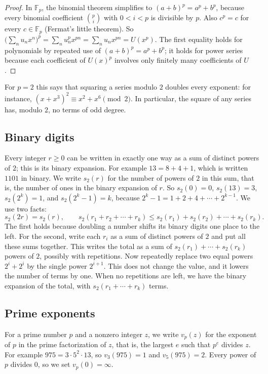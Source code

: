 \documentclass[11pt,a4paper]{article}
\theoremstyle{definition}
\theoremstyle{remark}
\newcommand{\F}{\mathbb{F}}
\begin{document}
\begin{proof}
In $\F_p$, the binomial theorem simplifies to $(a+b)^p=a^p+b^p$, because every binomial coefficient
$\binom pi$ with $0<i<p$ is divisible by $p$. Also $c^p=c$ for every $c\in\F_p$ (Fermat's little theorem). So
$\bigl(\sum_nu_nx^n\bigr)^p=\sum_nu_n^px^{pn}=\sum_nu_nx^{pn}=U(x^p)$. The first equality holds for polynomials by
repeated use of $(a+b)^p=a^p+b^p$; it holds for power series because each coefficient of $U(x)^p$ involves only finitely
many coefficients of $U$.
\end{proof}

For $p=2$ this says that squaring a series modulo $2$ doubles every exponent: for instance,
$(x+x^3)^2\equiv x^2+x^6\pmod2$. In particular, the square of any series has, modulo $2$, no terms of odd degree.

\subsection{Binary digits}
Every integer $r\ge0$ can be written in exactly one way as a sum of distinct powers of $2$; this is its binary
expansion. For example $13=8+4+1$, which is written $1101$ in binary. We write $s_2(r)$ for the number of powers of $2$
in this sum, that is, the number of ones in the binary expansion of $r$. So $s_2(0)=0$, $s_2(13)=3$, $s_2(2^k)=1$, and
$s_2(2^k-1)=k$, because $2^k-1=1+2+4+\cdots+2^{k-1}$. We use two facts:
\begin{equation}\label{eq:digits}
s_2(2r)=s_2(r),\qquad s_2(r_1+r_2+\cdots+r_k)\le s_2(r_1)+s_2(r_2)+\cdots+s_2(r_k).
\end{equation}
The first holds because doubling a number shifts its binary digits one place to the left. For the second, write each
$r_i$ as a sum of distinct powers of $2$ and put all these sums together. This writes the total as a sum of
$s_2(r_1)+\cdots+s_2(r_k)$ powers of $2$, possibly with repetitions. Now repeatedly replace two equal powers
$2^i+2^i$ by the single power $2^{i+1}$. This does not change the value, and it lowers the number of terms by one.
When no repetitions are left, we have the binary expansion of the total, with $s_2(r_1+\cdots+r_k)$ terms.

\subsection{Prime exponents}
For a prime number $p$ and a nonzero integer $z$, we write $v_p(z)$ for the exponent of $p$ in the prime factorization
of $z$, that is, the largest $e$ such that $p^e$ divides $z$. For example $975=3\cdot5^2\cdot13$, so $v_3(975)=1$ and
$v_5(975)=2$. Every power of $p$ divides $0$, so we set $v_p(0)=\infty$.
\end{document}
